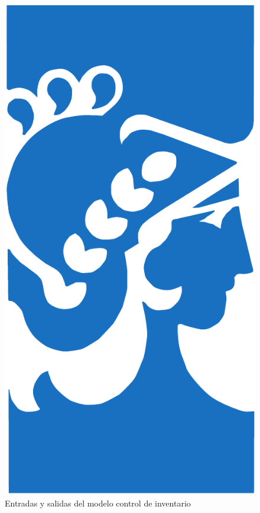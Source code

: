 \documentclass[10pt]{article}
\begin{document}
\begin{figure}[htbp]
	\centering
	\includegraphics{img/fiuba}
	\caption{Entradas y salidas del modelo control de inventario}
	\label{fig:CI-esquematico}
\end{figure}
\end{document}
